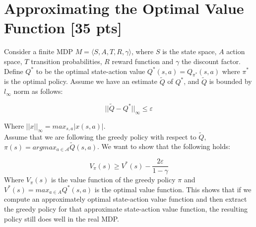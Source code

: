 \documentclass[11pt]{article}
\let\epsilon\varepsilon
\begin{document}
\section{Approximating the Optimal Value Function [35 pts]}
Consider a finite MDP $M=\langle S, A, T, R, \gamma \rangle$, where $S$ is the state space, $A$ action space, $T$ transition probabilities, $R$ reward function and $\gamma$ the discount factor. Define $Q^*$ to be the optimal state-action value $Q^*(s,a) = Q_{\pi^*}(s,a)$ where $\pi^*$ is the optimal policy. Assume we have an estimate $\tilde{Q}$ of $Q^*$, and $\tilde{Q}$ is bounded by $l_{\infty}$ norm as follows:

\begin{equation}
||\tilde{Q} - Q^*||_{\infty} \leq \epsilon
\end{equation}

\noindent Where $||x||_{\infty} = max_{s,a} |x(s,a)|$.\\

\noindent Assume that we are following the greedy policy with respect to $\tilde{Q}$, $\pi(s) = argmax_{a\in \mathcal{A}} \tilde{Q}(s,a)$. We want to show that the following holds:

\begin{equation}\label{eq:Q3} 
V_{\pi}(s) \geq V^*(s) - \frac{2\epsilon}{1-\gamma}
\end{equation}
\noindent Where $V_{\pi}(s)$ is the value function of the greedy policy $\pi$ and $V^*(s)=max_{a \in A} Q^*(s,a)$ is the optimal value function. This shows that if we compute an approximately optimal state-action value
function and then extract the greedy policy for that approximate state-action value
function, the resulting policy still does well in the real MDP.
\end{document}
